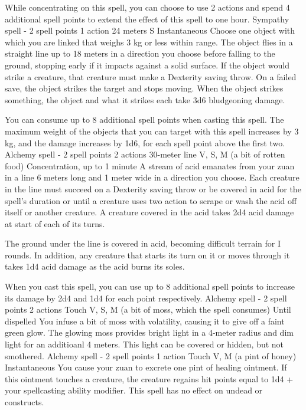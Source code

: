     While concentrating on this spell, you can choose to use 2 actions and spend 4 additional spell points to extend the effect of this spell to one hour.
    {Sympathy spell - 2 spell points}
    {1 action}
    {24 meters}
    {S}
    {Instantaneous}
    Choose one object with which you are linked that weighs 3 kg or less within range.
    The object flies in a straight line up to 18 meters in a direction you choose before falling to the ground, stopping early if it impacts against a solid surface.
    If the object would strike a creature, that creature must make a Dexterity saving throw.
    On a failed save, the object strikes the target and stops moving.
    When the object strikes something, the object and what it strikes each take 3d6 bludgeoning damage.

    You can consume up to 8 additional spell points when casting this spell.
    The maximum weight of the objects that you can target with this spell increases by 3 kg, and the damage increases by 1d6, for each spell point above the first two.
    {Alchemy spell - 2 spell points}
    {2 actions}
    {30-meter line}
    {V, S, M (a bit of rotten food)}
    {Concentration, up to 1 minute}
    A stream of acid emanates from your zuan in a line 6 meters long and 1 meter wide in a direction you choose.
    Each creature in the line must succeed on a Dexterity saving throw or be covered in acid for the spell's duration or until a creature uses two action to scrape or wash the acid off itself or another creature.
    A creature covered in the acid takes 2d4 acid damage at start of each of its turns.

    The ground under the line is covered in acid, becoming difficult terrain for I rounds.
    In addition, any creature that starts its turn on it or moves through it takes 1d4 acid damage as the acid burns its soles.

    When you cast this spell, you can use up to 8 additional spell points to increase its damage by 2d4 and 1d4 for each point respectively.
    {Alchemy spell - 2 spell points}
    {2 actions}
    {Touch}
    {V, S, M (a bit of moss, which the spell consumes)}
    {Until dispelled}
    You infuse a bit of moss with volatility, causing it to give off a faint green glow.
    The glowing moss provides bright light in a 4-meter radius and dim light for an additioanl 4 meters.
    This light can be covered or hidden, but not smothered.
    {Alchemy spell - 2 spell points}
    {1 action}
    {Touch}
    {V, M (a pint of honey)}
    {Instantaneous}
    You cause your zuan to excrete one pint of healing ointment.
    If this ointment touches a creature, the creature regains hit points equal to 1d4 + your spellcasting ability modifier.
    This spell has no effect on undead or constructs.

